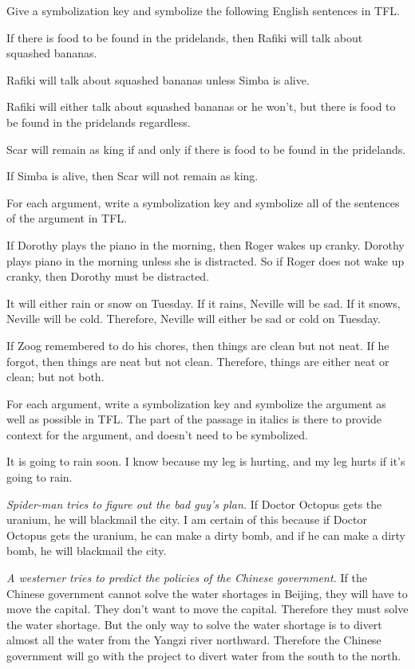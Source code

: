 \solutions
\problempart Give a symbolization key and symbolize the following English sentences in TFL.
\begin{compactlist}
\item If there is food to be found in the pridelands, then Rafiki will talk about squashed bananas.
\item Rafiki will talk about squashed bananas unless Simba is alive.
\item Rafiki will either talk about squashed bananas or he won't, but there is food to be found in the pridelands regardless.
\item Scar will remain as king if and only if there is food to be found in the pridelands.
\item If Simba is alive, then Scar will not remain as king.
\end{compactlist}

\problempart
For each argument, write a symbolization key and symbolize all of the sentences of the argument in TFL.
\begin{compactlist}
\item If Dorothy plays the piano in the morning, then Roger wakes up cranky. Dorothy plays piano in the morning unless she is distracted. So if Roger does not wake up cranky, then Dorothy must be distracted.
\item It will either rain or snow on Tuesday. If it rains, Neville will be sad. If it snows, Neville will be cold. Therefore, Neville will either be sad or cold on Tuesday.
\item If Zoog remembered to do his chores, then things are clean but not neat. If he forgot, then things are neat but not clean. Therefore, things are either neat or clean; but not both.
\end{compactlist}

\problempart
For each argument, write a symbolization key and symbolize the argument as well as possible in TFL. The part of the passage in italics is there to provide context for the argument, and doesn't need to be symbolized.
\begin{compactlist}
\item It is going to rain soon. I know because my leg is hurting, and my leg hurts if it's going to rain.

\item  \emph{Spider-man tries to figure out the bad guy's plan.} If Doctor Octopus gets the uranium, he will blackmail the city. I am certain of this because if Doctor Octopus gets the uranium, he can make a dirty bomb, and if he can make a dirty bomb, he will blackmail the city.

\item \emph{A westerner tries to predict the policies of the Chinese government.} If the Chinese government cannot solve the water shortages in Beijing, they will have to move the capital. They don't want to move the capital. Therefore they must solve the water shortage. But the only way to solve the water shortage is to divert almost all the water from the Yangzi river northward. Therefore the Chinese government will go with the project to divert water from the south to the north.       

\end{compactlist}


